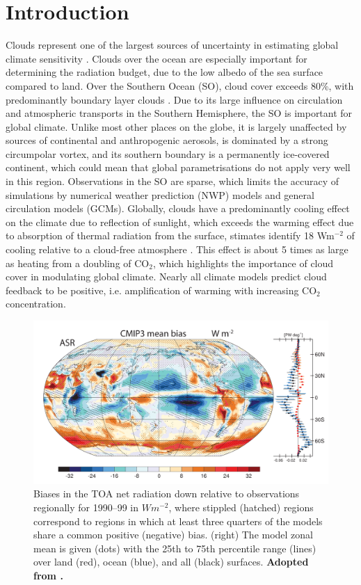 \chapter{Introduction}

Clouds represent one of the largest sources of uncertainty in estimating global
climate sensitivity \citep{williams2017}. Clouds over the ocean
are especially important for determining the radiation budget, due to the
low albedo of the sea surface compared to land.
Over the Southern Ocean (SO),
cloud cover exceeds 80\%, with predominantly boundary layer clouds \citep{mace2009}.
Due to its large influence on circulation and atmospheric transports in the
Southern Hemisphere, the SO is important for global climate. Unlike
most other places on the globe, it is largely unaffected by sources of
continental and anthropogenic aerosols, is dominated by a strong circumpolar
vortex, and its southern boundary is a permanently ice-covered continent,
which could mean that global parametrisations do not apply very well in this
region. Observations in the SO are sparse, which limits the accuracy
of simulations by numerical weather prediction (NWP) models and general
circulation models (GCMs).
Globally, clouds have a predominantly cooling effect on the climate due to reflection
of sunlight, which exceeds the warming effect due to absorption of thermal
radiation from the surface, stimates identify 18 Wm$^{-2}$ of cooling relative to a cloud-free atmosphere
\citep{zelinka2017}. This effect is about 5 times as large as heating from
a doubling of CO$_2$, which highlights the importance of cloud cover in modulating
global climate. Nearly all climate models predict cloud feedback to be positive,
i.e. amplification of warming with increasing CO$_2$ concentration.

\begin{figure}[t]
\centering
\includegraphics[width=\textwidth]{fig/trenberth-fassulo-sw-bias.png}
\caption{
Biases in the TOA net radiation down relative to observations regionally for
1990--99
in $Wm^{-2}$, where stippled (hatched) regions correspond to regions
in which at least three quarters of the models share a common
positive (negative) bias. (right) The model zonal mean is given
(dots) with the 25th to 75th percentile range (lines) over land (red),
ocean (blue), and all (black) surfaces. \textbf{Adopted from
\cite{trenberth2010}.}
}
\label{fig:trenberth-fassulo-sw-bias}
\end{figure}

